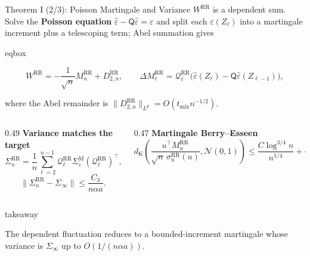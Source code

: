 \documentclass[11pt,aspectratio=169,xcolor=table]{beamer}
\newcommand{\colhead}[1]{\textcolor{ThesisBlue}{\bfseries #1}}
\newcommand{\RR}{\mathrm{RR}}
\newcommand{\MC}{\mathrm{M}}
\newcommand{\eps}{\varepsilon}
\newenvironment{eqbox}
  {\begin{beamercolorbox}[wd=\linewidth,sep=0.48em,center,rounded=true]{eqbox}%
   \begin{minipage}{0.97\linewidth}\centering}
  {\end{minipage}\end{beamercolorbox}}
\newenvironment{takeawaybox}
  {\begin{beamercolorbox}[wd=\linewidth,sep=0.52em,leftskip=0.25em,rightskip=0.25em,rounded=true]{takeaway}%
   \begin{minipage}{0.96\linewidth}%
   \llap{{\color{ThesisGreen}\rule{2.5pt}{2.6ex}}\hspace{0.5em}}}
  {\end{minipage}\end{beamercolorbox}}
\begin{document}
\begin{frame}[shrink=10]{Theorem I (2/3): Poisson Martingale and Variance}
\footnotesize
$W^\RR$ is a dependent sum. Solve the \textbf{Poisson equation}
$\widehat\eps-\mathsf Q\widehat\eps=\eps$ and split each $\eps(Z_\ell)$ into
a martingale increment plus a telescoping term; Abel summation gives

\begin{eqbox}
\[
  W^\RR=-\frac1{\sqrt n}M_n^\RR+D_{2,n}^\RR,\qquad
  \Delta M_\ell^\RR
  =\mathcal Q_\ell^\RR
    \bigl(\widehat\eps(Z_\ell)-\mathsf Q\widehat\eps(Z_{\ell-1})\bigr),
\]
\end{eqbox}

where the Abel remainder is
$\lVert D_{2,n}^\RR\rVert_{L^p}=O(t_{\mathrm{mix}}n^{-1/2})$.

\vspace{0.25em}
\begin{columns}[T,onlytextwidth]
  \begin{column}{0.49\textwidth}
    \colhead{Variance matches the target}
    \[
      \Sigma_n^\RR=\frac1n\sum_{\ell=2}^{n-1}
      \mathcal Q_\ell^\RR\Sigma_\eps^\MC
      (\mathcal Q_\ell^\RR)^\top,
    \]
    \[
      \lVert\Sigma_n^\RR-\Sigma_\infty\rVert
      \leq\frac{C_3}{n\alpha a}.
    \]
  \end{column}
  \begin{column}{0.47\textwidth}
    \colhead{Martingale Berry--Esseen}
    \[
      d_{\mathrm K}\!\left(
        \frac{u^\top M_n^\RR}
             {\sqrt n\,\sigma_n^\RR(u)},\mathcal N(0,1)\right)
      \leq\frac{C\log^{3/4}n}{n^{1/4}}
          +\frac{C\log n}{\sqrt n}.
    \]
  \end{column}
\end{columns}

\vspace{0.15em}
\begin{takeawaybox}
The dependent fluctuation reduces to a bounded-increment martingale whose
variance is $\Sigma_\infty$ up to $O(1/(n\alpha a))$.
\end{takeawaybox}
\end{frame}
\end{document}
